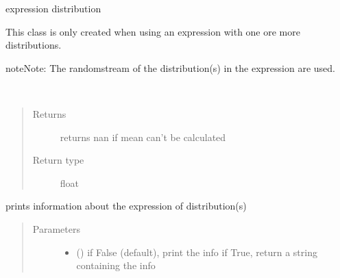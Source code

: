 \documentclass[letterpaper,10pt,english]{sphinxmanual}
\begin{document}
\begin{fulllineitems}
\label{\detokenize{Reference:salabim._Expression}}
expression distribution

This class is only created when using an expression with one ore more distributions.

\begin{sphinxadmonition}{note}{Note:}
The randomstream of the distribution(s) in the expression are used.
\end{sphinxadmonition}

\begin{fulllineitems}
\label{\detokenize{Reference:salabim._Expression.mean}}~\begin{quote}\begin{description}
\item[{Returns}] \leavevmode
{} \textendash{} returns nan if mean can’t be calculated

\item[{Return type}] \leavevmode
float

\end{description}\end{quote}

\end{fulllineitems}


\begin{fulllineitems}
\label{\detokenize{Reference:salabim._Expression.print_info}}
prints information about the expression of distribution(s)
\begin{quote}\begin{description}
\item[{Parameters}] \leavevmode\begin{itemize}
\item {} 
 () \textendash{} if False (default), print the info
if True, return a string containing the info


\end{itemize}
\end{description}
\end{quote}
\end{fulllineitems}
\end{fulllineitems}
\end{document}
